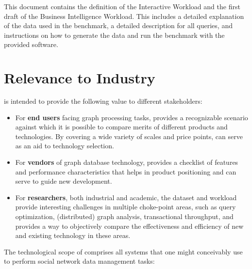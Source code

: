 This document contains the definition of the Interactive Workload and the first
draft of the Business Intelligence Workload. This includes a detailed
explanation of the data used in the \ldbcsnb benchmark, a detailed description
for all queries, and instructions on how to generate the data and run the
benchmark with the provided software.  


\section{Relevance to Industry}

\ldbcsnb is intended to provide the following value to different stakeholders:

\begin{itemize}
 \item For \textbf{end users} facing graph processing tasks, \ldbcsnb provides
     a recognizable scenario against which it is possible to compare merits of
     different products and technologies.  By covering a wide variety of scales
     and price points, \ldbcsnb can serve as an aid to technology selection.
 \item For \textbf{vendors} of graph database technology, \ldbcsnb provides a
     checklist of features and performance characteristics that helps in
     product positioning and can serve to guide new development.
 \item For \textbf{researchers}, both industrial and academic, the \ldbcsnb
     dataset and workload provide interesting challenges in multiple
     choke-point areas, such as query optimization, (distributed) graph
     analysis, transactional throughput, and provides a way to objectively
     compare the effectiveness and efficiency of new and existing technology in
     these areas.
\end{itemize}

The technological scope of \ldbcsnb comprises all systems that one might
conceivably use to perform social network data management tasks:

